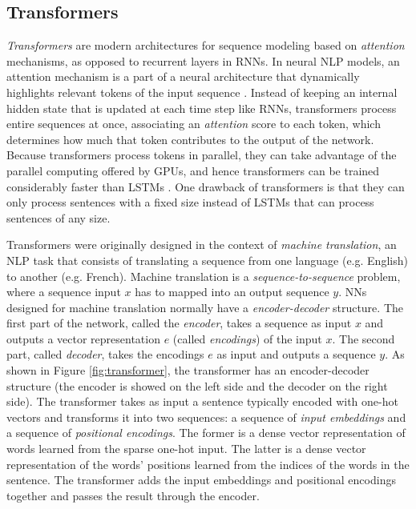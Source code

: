 \subsection{Transformers}

\textit{Transformers} \cite{vaswani2017attention} are modern architectures for sequence modeling based on \textit{attention} mechanisms, as opposed to recurrent layers in RNNs. In neural NLP models, an attention mechanism is a part of a neural architecture that dynamically highlights relevant tokens of the input sequence \cite{bahdanau2014neural}. Instead of keeping an internal hidden state that is updated at each time step like RNNs, transformers process entire sequences at once, associating an \textit{attention} score to each token, which determines how much that token contributes to the output of the network. Because transformers process tokens in parallel, they can take advantage of the parallel computing offered by GPUs, and hence transformers can be trained considerably faster than LSTMs \cite{vaswani2017attention}. One drawback of transformers is that they can only process sentences with a fixed size instead of LSTMs that can process sentences of any size.

Transformers were originally designed in the context of \textit{machine translation}, an NLP task that consists of translating a sequence from one language (e.g. English) to another (e.g. French). Machine translation is a \textit{sequence-to-sequence} problem, where a sequence input $x$ has to mapped into an output sequence $y$. NNs designed for machine translation normally have a \textit{encoder-decoder} structure. The first part of the network, called the \textit{encoder}, takes a sequence as input $x$ and outputs a vector representation $e$ (called \textit{encodings}) of the input $x$. The second part, called \textit{decoder}, takes the encodings $e$ as input and outputs a sequence $y$. As shown in Figure \ref{fig:transformer}, the transformer has an encoder-decoder structure (the encoder is showed on the left side and the decoder on the right side). The transformer takes as input a sentence typically encoded with one-hot vectors and transforms it into two sequences: a sequence of \textit{input embeddings} and a sequence of \textit{positional encodings}. The former is a dense vector representation of words learned from the sparse one-hot input. The latter is a dense vector representation of the words' positions learned from the indices of the words in the sentence. The transformer adds the input embeddings and positional encodings together and passes the result through the encoder.

